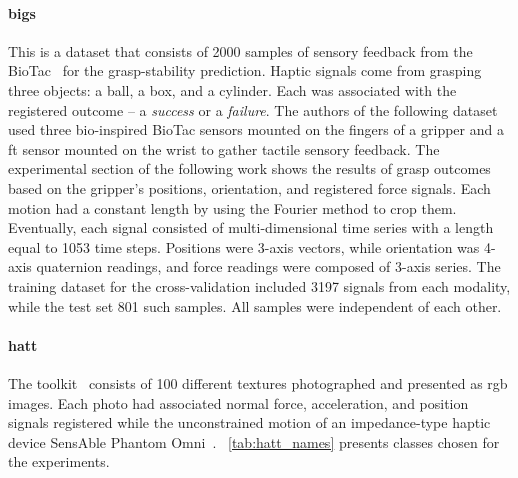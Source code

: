 \documentclass[a4paper, 10pt, twoside]{report}
\begin{document}
\paragraph{\acrfull{bigs}} This is a dataset that consists of 2000 samples of sensory feedback from the BioTac~\cite{biotac_sensor} for the grasp-stability prediction. Haptic signals come from grasping three objects: a ball, a box, and a cylinder. Each was associated with the registered outcome -- a \textit{success} or a \textit{failure}. The authors of the following dataset used three bio-inspired BioTac sensors mounted on the fingers of a gripper and a \acrshort{ft} sensor mounted on the wrist to gather tactile sensory feedback. The experimental section of the following work shows the results of grasp outcomes based on the gripper's positions, orientation, and registered force signals. Each motion had a constant length by using the Fourier method to crop them. Eventually, each signal consisted of multi-dimensional time series with a length equal to 1053 time steps. Positions were 3-axis vectors, while orientation was 4-axis quaternion readings, and force readings were composed of 3-axis series. The training dataset for the cross-validation included 3197 signals from each modality, while the test set 801 such samples. All samples were independent of each other.

\paragraph{\acrfull{hatt}} The toolkit~\cite{penn_haptix} consists of 100 different textures photographed and presented as \acrshort{rgb} images. Each photo had associated normal force, acceleration, and position signals registered while the unconstrained motion of an impedance-type haptic device SensAble Phantom Omni~\cite{haptic_device}. \Table~\ref{tab:hatt_names} presents classes chosen for the experiments.

\begin{table}[H]
\centering
\caption{Textures from the \acrshort{hatt} chosen for the experiments.}

\label{tab:hatt_names}
\end{table}
\end{document}
